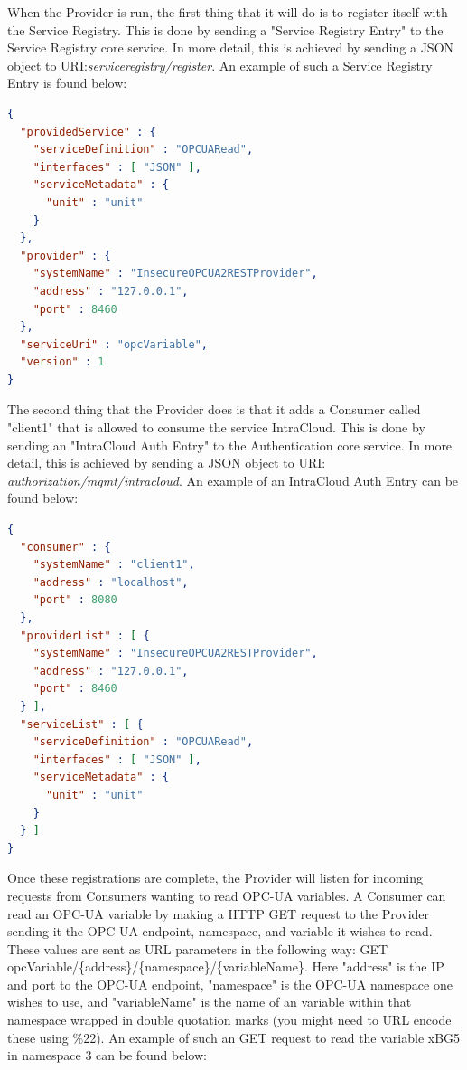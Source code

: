 \documentclass[a4paper]{arrowhead}
\begin{document}
When the Provider is run, the first thing that it will do is to register itself with the Service Registry. This is done by sending a "Service Registry Entry" to the Service Registry core service. In more detail, this is achieved by sending a JSON object to URI:\textit{serviceregistry/register}. An example of such a Service Registry Entry is found below:

\begin{lstlisting}[language=json,firstnumber=1]
{
  "providedService" : {
    "serviceDefinition" : "OPCUARead",
    "interfaces" : [ "JSON" ],
    "serviceMetadata" : {
      "unit" : "unit"
    }
  },
  "provider" : {
    "systemName" : "InsecureOPCUA2RESTProvider",
    "address" : "127.0.0.1",
    "port" : 8460
  },
  "serviceUri" : "opcVariable",
  "version" : 1
}
\end{lstlisting}

The second thing that the Provider does is that it adds a Consumer called "client1" that is allowed to consume the service IntraCloud. This is done by sending an "IntraCloud Auth Entry" to the Authentication core service. In more detail, this is achieved by sending a JSON object to URI: \textit{authorization/mgmt/intracloud}. An example of an IntraCloud Auth Entry can be found below:

\begin{lstlisting}[language=json,firstnumber=1]
{
  "consumer" : {
    "systemName" : "client1",
    "address" : "localhost",
    "port" : 8080
  },
  "providerList" : [ {
    "systemName" : "InsecureOPCUA2RESTProvider",
    "address" : "127.0.0.1",
    "port" : 8460
  } ],
  "serviceList" : [ {
    "serviceDefinition" : "OPCUARead",
    "interfaces" : [ "JSON" ],
    "serviceMetadata" : {
      "unit" : "unit"
    }
  } ]
}
\end{lstlisting}

Once these registrations are complete, the Provider will listen for incoming requests from Consumers wanting to read OPC-UA variables. A Consumer can read an OPC-UA variable by making a HTTP GET request to the Provider sending it the OPC-UA endpoint, namespace, and variable it wishes to read. These values are sent as URL parameters in the following way: GET opcVariable/\{address\}/\{namespace\}/\{variableName\}. Here "address" is the IP and port to the OPC-UA endpoint, "namespace" is the OPC-UA namespace one wishes to use, and "variableName" is the name of an variable within that namespace wrapped in double quotation marks (you might need to URL encode these using \%22). An example of such an GET request to read the variable xBG5 in namespace 3 can be found below:
\end{document}
